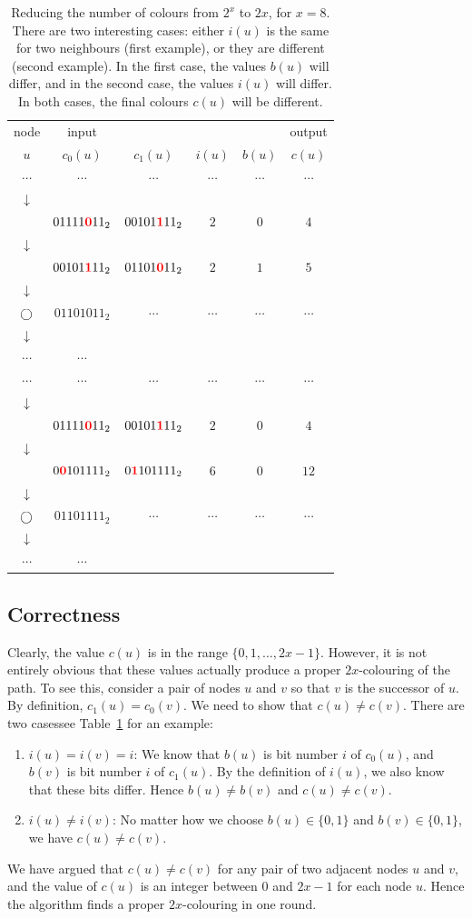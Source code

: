 \begin{table}
    \newcommand{\hl}[1]{\mathbf{\color{red}#1}}
    \newcommand{\node}{\raisebox{-1pt}{$\bigcirc$}}
    \newcommand{\mylf}{\\[-2pt]}
    \center
    \begin{tabular}{@{}c@{\qquad}ccccc@{}}
    \toprule
    node & input &&&& output \\
    $u$ & $c_0(u)$ & $c_1(u)$ & $i(u)$ & $b(u)$ & $c(u)$ \\
    \midrule
    $\cdots$ & $\cdots$ & $\cdots$ & $\cdots$ & $\cdots$ & $\cdots$ \mylf
    $\downarrow$ \mylf
    \node & $01111\hl{0}11_2$ & $00101\hl{1}11_2$ & $2$ & $0$ & $4$ \mylf
    $\downarrow$ \mylf
    \node & $00101\hl{1}11_2$ & $01101\hl{0}11_2$ & $2$ & $1$ & $5$ \mylf
    $\downarrow$ \mylf
    $\node$ & $01101011_2$ & $\cdots$ & $\cdots$ & $\cdots$ & $\cdots$ \mylf
    $\downarrow$ \mylf
    $\cdots$ & $\cdots$ \mylf
    \midrule
    $\cdots$ & $\cdots$ & $\cdots$ & $\cdots$ & $\cdots$ & $\cdots$ \mylf
    $\downarrow$ \mylf
    \node & $01111\hl{0}11_2$ & $00101\hl{1}11_2$ & $2$ & $0$ & $4$ \mylf
    $\downarrow$ \mylf
    \node & $0\hl{0}101111_2$ & $0\hl{1}101111_2$ & $6$ & $0$ & $12$ \mylf
    $\downarrow$ \mylf
    $\node$ & $01101111_2$ & $\cdots$ & $\cdots$ & $\cdots$ & $\cdots$ \mylf
    $\downarrow$ \mylf
    $\cdots$ & $\cdots$ \mylf
    \bottomrule
    \end{tabular}
    \caption{Reducing the number of colours from $2^x$ to $2x$, for $x = 8$. There are two interesting cases: either $i(u)$ is the same for two neighbours (first example), or they are different (second example). In the first case, the values $b(u)$ will differ, and in the second case, the values $i(u)$ will differ. In both cases, the final colours $c(u)$ will be different.}\label{tab:intro-id-fast}
\end{table}


\subsection{Correctness}

Clearly, the value $c(u)$ is in the range $\{0,1,\dotsc,2x-1\}$. However, it is not entirely obvious that these values actually produce a proper $2x$-colouring of the path. To see this, consider a pair of nodes $u$ and $v$ so that $v$ is the successor of $u$. By definition, $c_1(u) = c_0(v)$. We need to show that $c(u) \ne c(v)$. There are two cases\mydash see Table~\ref{tab:intro-id-fast} for an example:
\begin{enumerate}
    \item $i(u) = i(v) = i$: We know that $b(u)$ is bit number $i$ of $c_0(u)$, and $b(v)$ is bit number $i$ of $c_1(u)$. By the definition of $i(u)$, we also know that these bits differ. Hence $b(u) \ne b(v)$ and $c(u) \ne c(v)$.
    \item $i(u) \ne i(v)$: No matter how we choose $b(u) \in \{0,1\}$ and $b(v) \in \{0,1\}$, we have $c(u) \ne c(v)$.
\end{enumerate}
We have argued that $c(u) \ne c(v)$ for any pair of two adjacent nodes $u$ and $v$, and the value of $c(u)$ is an integer between $0$ and $2x-1$ for each node $u$. Hence the algorithm finds a proper $2x$-colouring in one round.


